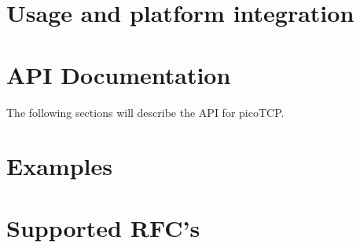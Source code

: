 \chapter{Usage and platform integration}
\label{chap:usage}
%


\chapter{API Documentation}
\label{chap:api_doc}
The following sections will describe the API for picoTCP.






\chapter{Examples}
\label{chap:examples}
%

\chapter{Supported RFC's}
\label{chap:rfcs}



